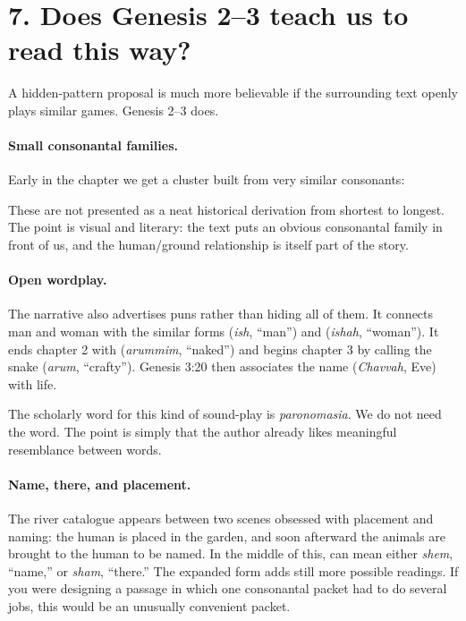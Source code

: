 \section*{7. Does Genesis 2--3 teach us to read this way?}

A hidden-pattern proposal is much more believable if the surrounding text openly plays similar games. Genesis 2--3 does.

\paragraph{Small consonantal families.}
Early in the chapter we get a cluster built from very similar consonants:


These are not presented as a neat historical derivation from shortest to longest. The point is visual and literary: the text puts an obvious consonantal family in front of us, and the human/ground relationship is itself part of the story.

\paragraph{Open wordplay.}
The narrative also advertises puns rather than hiding all of them. It connects man and woman with the similar forms  (\textit{ish}, ``man'') and  (\textit{ishah}, ``woman''). It ends chapter 2 with  (\textit{arummim}, ``naked'') and begins chapter 3 by calling the snake  (\textit{arum}, ``crafty''). Genesis 3:20 then associates the name  (\textit{Chavvah}, Eve) with life.\cite{WaltkeOConnor1990,Westermann1984}

The scholarly word for this kind of sound-play is \emph{paronomasia}. We do not need the word. The point is simply that the author already likes meaningful resemblance between words.

\paragraph{Name, there, and placement.}
The river catalogue appears between two scenes obsessed with placement and naming: the human is placed in the garden, and soon afterward the animals are brought to the human to be named. In the middle of this,  can mean either \textit{shem}, ``name,'' or \textit{sham}, ``there.'' The expanded form  adds still more possible readings. If you were designing a passage in which one consonantal packet had to do several jobs, this would be an unusually convenient packet.

